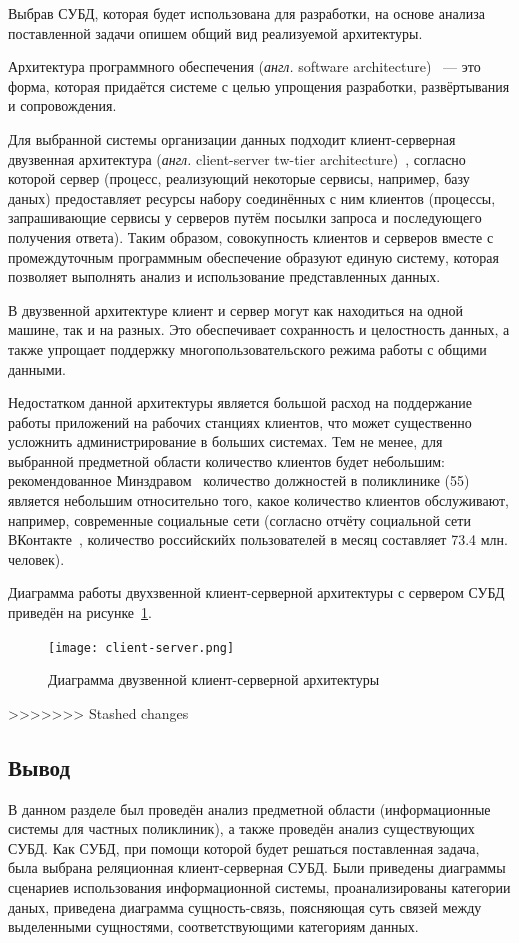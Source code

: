Выбрав СУБД, которая будет использована для разработки, на основе анализа поставленной задачи опишем общий вид реализуемой архитектуры.

Архитектура программного обеспечения (\textit{англ.} software architecture)~\cite{clean-architecture} --- это форма, которая придаётся системе с целью упрощения разработки, развёртывания и сопровождения. 

Для выбранной системы организации данных подходит клиент-серверная двузвенная архитектура (\textit{англ.} client-server tw-tier architecture)~\cite{client-server}, согласно которой сервер (процесс, реализующий некоторые сервисы, например, базу даных) предоставляет ресурсы набору соединённых с ним клиентов (процессы, запрашивающие сервисы у серверов путём посылки запроса и последующего получения ответа).
Таким образом, совокупность клиентов и серверов вместе с промеждуточным программным обеспечение образуют единую систему, которая позволяет выполнять анализ и использование представленных данных.

В двузвенной архитектуре клиент и сервер могут как находиться на одной машине, так и на разных. 
Это обеспечивает сохранность и целостность данных, а также  упрощает поддержку многопользовательского режима работы с общими данными.

Недостатком данной архитектуры является большой расход на поддержание работы приложений на рабочих станциях клиентов, что может существенно усложнить администрирование в больших системах.
Тем не менее, для выбранной предметной области количество клиентов будет небольшим: рекомендованное Минздравом~\cite{minsdrav-state} количество должностей в поликлинике (55) является небольшим относительно того, какое количество клиентов обслуживают, например, современные социальные сети (согласно отчёту социальной сети ВКонтакте~\cite{vk-results}, количество российскийх пользователей в месяц составляет 73.4 млн. человек).

Диаграмма работы двухзвенной клиент-серверной архитектуры с сервером СУБД приведён на рисунке~\ref{fig:client-server}.


\begin{figure}[h!]
	\centering
	\captionsetup{justification=centering}
	\texttt{[image: client-server.png]}
	\caption{Диаграмма двузвенной клиент-серверной архитектуры}
	\label{fig:client-server}
\end{figure}
>>>>>>> Stashed changes

\subsection*{Вывод}
В данном разделе был проведён анализ предметной области (информационные системы для частных поликлиник), а также проведён анализ существующих СУБД. 
Как СУБД, при помощи которой будет решаться поставленная задача, была выбрана реляционная клиент-серверная СУБД.
Были приведены диаграммы сценариев использования информационной системы, проанализированы категории даных, приведена диаграмма сущность-связь, поясняющая суть связей между выделенными сущностями, соответствующими категориям данных.


